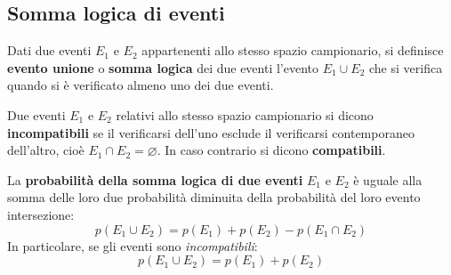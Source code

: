 \documentclass{article}     %
\begin{document}
            \subsection{Somma logica di eventi}
                \begin{boxdef}
                    Dati due eventi $E_1$ e $E_2$ appartenenti allo stesso spazio campionario, si definisce \textbf{evento unione} o \textbf{somma logica} dei due eventi l'evento $E_1 \cup E_2$ che si verifica quando si è verificato almeno uno dei due eventi. 
                \end{boxdef}
                \begin{boxdef}
                    Due eventi $E_1$ e $E_2$ relativi allo stesso spazio campionario si dicono \textbf{incompatibili} se il verificarsi dell'uno esclude il verificarsi contemporaneo dell'altro, cioè $E_1\cap E_2=\varnothing$. In caso contrario si dicono \textbf{compatibili}. 
                \end{boxdef}
                \begin{thm}
                    La \textbf{probabilità della somma logica di due eventi} $E_1$ e $E_2$ è uguale alla somma delle loro due probabilità diminuita della probabilità del loro evento intersezione:
                    \[p(E_1\cup E_2)=p(E_1)+p(E_2)-p(E_1\cap E_2)\]
                    In particolare, se gli eventi sono \textit{incompatibili}:
                    \[p(E_1\cup E_2)=p(E_1)+p(E_2)\]
                \end{thm}
\end{document}
